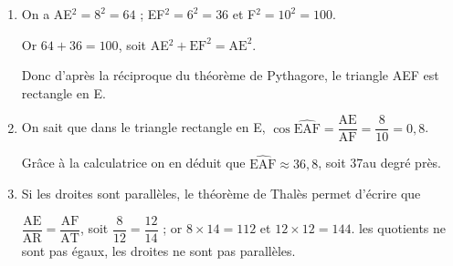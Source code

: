 
\medskip

%	
%	
%	
%
%
%
%

\begin{enumerate}
	\item %
On a AE$^2 = 8^2 = 64$ ; EF$^2 = 6^2 = 36$ et F$^2 = 10^2 = 100$.

Or $64 + 36 = 100$, soit AE$^2 + \text{EF}^2 = \text{AE}^2$.

Donc d'après la réciproque du théorème de Pythagore, le triangle AEF est rectangle en E.	
	\item %
	On sait que dans le triangle rectangle en E, $\cos \widehat{\text{EAF}} = \dfrac{\text{AE}}{\text{AF}} = \dfrac{8}{10} = 0,8$.
	
	Grâce à la calculatrice on en déduit que $\widehat{\text{EAF}} \approx 36,8$, soit 37\degres au degré près.
	\item %
Si les droites sont parallèles, le théorème de Thalès permet d'écrire que 

$\dfrac{\text{AE}}{\text{AR}} = \dfrac{\text{AF}}{\text{AT}}$, soit $\dfrac{8}{12} = \dfrac{12}{14}$ ; or $8 \times 14 = 112$ et $12 \times 12 = 144$. les quotients ne sont pas égaux, les droites ne sont pas parallèles.
\end{enumerate}

\vspace{0,5cm}

